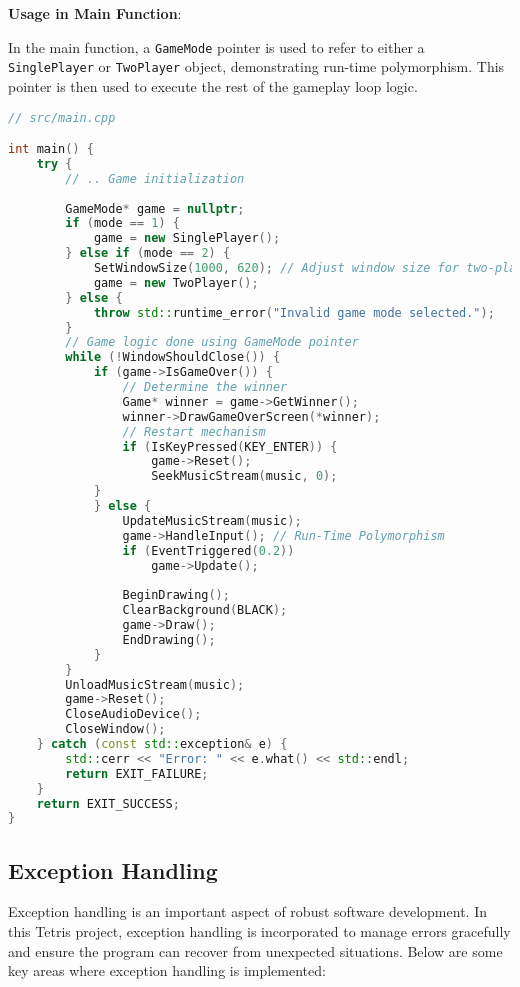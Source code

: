 \documentclass{article}
\begin{document}
\textbf{Usage in Main Function}:

In the main function, a \texttt{GameMode} pointer is used to refer to either a \texttt{SinglePlayer} or \texttt{TwoPlayer} object, demonstrating run-time polymorphism. This pointer is then used to execute the rest of the gameplay loop logic.
\begin{lstlisting}[language=C++]
// src/main.cpp

int main() {
    try {
        // .. Game initialization 
        
        GameMode* game = nullptr;
        if (mode == 1) {
            game = new SinglePlayer();
        } else if (mode == 2) {
            SetWindowSize(1000, 620); // Adjust window size for two-player mode
            game = new TwoPlayer();
        } else {
            throw std::runtime_error("Invalid game mode selected.");
        }
        // Game logic done using GameMode pointer
        while (!WindowShouldClose()) {   
            if (game->IsGameOver()) {
                // Determine the winner
                Game* winner = game->GetWinner();
                winner->DrawGameOverScreen(*winner);
                // Restart mechanism
                if (IsKeyPressed(KEY_ENTER)) {
                    game->Reset();
                    SeekMusicStream(music, 0);
            }
            } else {
                UpdateMusicStream(music);
                game->HandleInput(); // Run-Time Polymorphism 
                if (EventTriggered(0.2)) 
                    game->Update();
                
                BeginDrawing();
                ClearBackground(BLACK);
                game->Draw();
                EndDrawing();
            } 
        }
        UnloadMusicStream(music);
        game->Reset();
        CloseAudioDevice();
        CloseWindow();
    } catch (const std::exception& e) {
        std::cerr << "Error: " << e.what() << std::endl;
        return EXIT_FAILURE;
    }
    return EXIT_SUCCESS;  
}
\end{lstlisting}
\subsection{Exception Handling}

Exception handling is an important aspect of robust software development. In this Tetris project, exception handling is incorporated to manage errors gracefully and ensure the program can recover from unexpected situations. Below are some key areas where exception handling is implemented:
\end{document}
